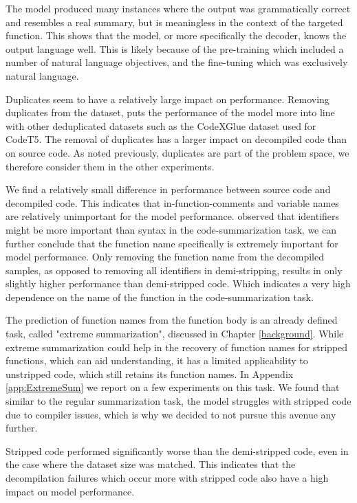 The model produced many instances where the output was grammatically correct and resembles a real summary, but is meaningless in the context of the targeted function. This shows that the model, or more specifically the decoder, knows the output language well. This is likely because of the pre-training which included a number of natural language objectives, and the fine-tuning which was exclusively natural language.

Duplicates seem to have a relatively large impact on performance. Removing duplicates from the dataset, puts the performance of the model more into line with other deduplicated datasets such as the CodeXGlue dataset used for CodeT5. The removal of duplicates has a larger impact on decompiled code than on source code. As noted previously, duplicates are part of the problem space, we therefore consider them in the other experiments.

We find a relatively small difference in performance between source code and decompiled code. This indicates that in-function-comments and variable names are relatively unimportant for the model performance. \citeauthor{PolyglotCodeBERT} observed that identifiers might be more important than syntax in the code-summarization task, we can further conclude that the function name specifically is extremely important for model performance. Only removing the function name from the decompiled samples, as opposed to removing all identifiers in demi-stripping, results in only slightly higher performance than demi-stripped code. Which indicates a very high dependence on the name of the function in the code-summarization task. 

The prediction of function names from the function body is an already defined task, called "extreme summarization", discussed in Chapter \ref{background}. While extreme summarization could help in the recovery of function names for stripped functions, which can aid understanding, it has a limited applicability to unstripped code, which still retains its function names. In Appendix \ref{app:ExtremeSum} we report on a few experiments on this task. We found that similar to the regular summarization task, the model struggles with stripped code due to compiler issues, which is why we decided to not pursue this avenue any further. 

Stripped code performed significantly worse than the demi-stripped code, even in the case where the dataset size was matched. This indicates that the decompilation failures which occur more with stripped code also have a high impact on model performance.

